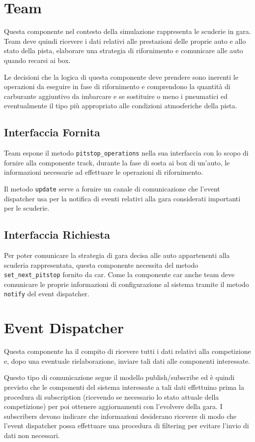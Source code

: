 \documentclass[11pt,a4paper]{report}
\newcommand{\fun}[1]{\texttt{#1}}
\begin{document}
\section{Team}
Questa componente nel contesto della simulazione rappresenta le scuderie in gara. Team deve quindi ricevere i dati relativi alle prestazioni delle proprie auto e allo stato della pista, elaborare una strategia di rifornimento e comunicare alle auto quando recarsi ai box.

Le decisioni che la logica di questa componente deve prendere sono inerenti le operazioni da eseguire in fase di rifornimento e comprendono la quantità di carburante aggiuntivo da imbarcare e se sostituire o meno i pneumatici ed eventualmente il tipo più appropriato alle condizioni atmosferiche della pista.
\subsection*{Interfaccia Fornita}
Team espone il metodo \fun{pitstop\_operations} nella sua interfaccia con lo scopo di fornire alla componente track, durante la fase di sosta ai box di un'auto, le informazioni necessarie ad effettuare le operazioni di rifornimento.

Il metodo \fun{update} serve a fornire un canale di comunicazione che l'event dispatcher usa per la notifica di eventi relativi alla gara considerati importanti per le scuderie.
\subsection*{Interfaccia Richiesta}
Per poter comunicare la strategia di gara decisa alle auto appartenenti alla scuderia rappresentata, questa componente necessita del metodo \fun{set\_next\_pitstop} fornito da car.
Come la componente car anche team deve comunicare le proprie informazioni di configurazione al sistema tramite il metodo \fun{notify} del event dispatcher.
\section{Event Dispatcher}
Questa componente ha il compito di ricevere tutti i dati relativi alla competizione e, dopo una eventuale rielaborazione, inviare tali dati alle componenti interessate.

Questo tipo di comunicazione segue il modello publish/subscribe ed è quindi previsto che le componenti del sistema interessate a tali dati effettuino prima la procedura di subscription (ricevendo se necessario lo stato attuale della competizione) per poi ottenere aggiornamenti con l'evolvere della gara. I subscribers devono indicare che informazioni desiderano ricevere di modo che l'event dispatcher possa effettuare una procedura di filtering per evitare l'invio di dati non necessari.
\end{document}
